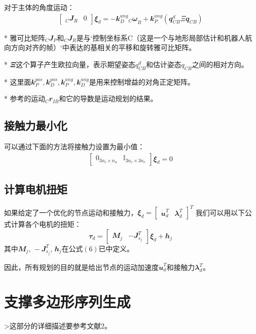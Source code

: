 对于主体的角度运动：
\begin{align}
    \begin{bmatrix}
    _C{\mathbfit J}_R & {\mathbfit 0}
    \end{bmatrix} 
    {\mathbfit \xi}_d = 
    - {\mathbfit k}_D^{ang} {_C{\mathbfit \omega}}_{B}
    + {\mathbfit k}_P^{ang}({\mathbfit q}_{CB}^d \Xi {\mathbfit q}_{CB})
\end{align}

* 雅可比矩阵$_C{\mathbfit J}_P$和$_C{\mathbfit J}_R$是与`控制坐标系C（这是一个与地形局部估计和机器人航向方向对齐的帧）`中表达的基相关的平移和旋转雅可比矩阵。

* ${\mathbfit \Xi}$这个算子产生欧拉向量，表示期望姿态$q^d_{CB}$和估计姿态$q_{CB}$之间的相对方向。

* 这里面${\mathbfit k}_P^{pos}, {\mathbfit k}_D^{pos}, {\mathbfit k}_P^{ang}, {\mathbfit k}_D^{ang}$是用来控制增益的对角正定矩阵。

* 参考的运动$_C{\mathbfit r}_{IB}$和它的导数是运动规划的结果。

\subsection{接触力最小化}
可以通过下面的方法将接触力设置为最小值：
\begin{align}
    \begin{bmatrix}
    {\mathbfit 0}_{3n_c \times n_u} & {\mathbb I}_{3n_c \times 3n_c}
    \end{bmatrix}
    {\mathbfit \xi}_d = 0
\end{align}

\subsection{计算电机扭矩}
如果给定了一个优化的节点运动和接触力，${\mathbfit \xi}_d = \begin{bmatrix}
\dot {\mathbfit u}_d^T & {\mathbfit \lambda}_d^T
\end{bmatrix}^T$
我们可以用以下公式计算各个电机的扭矩：
$${\mathbfit \tau}_d = \begin{bmatrix} {\mathbfit M}_j & -{\mathbfit J}^T_{s_j}\end{bmatrix} {\mathbfit \xi}_d + {\mathbfit h}_j$$
其中${\mathbfit M}_j,\, -{\mathbfit J}^T_{s_j}, \, {\mathbfit h}_j$在公式$(6)$已中定义。
\begin{note}
    因此，所有规划的目的就是给出节点的运动加速度$\dot{\mathbfit u}_d^T$和接触力${\mathbfit \lambda}_d^T$。
\end{note}

\section{支撑多边形序列生成}
>这部分的详细描述要参考文献2。


